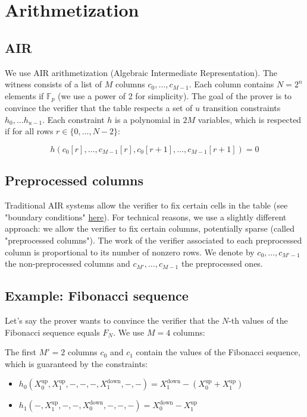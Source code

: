 \documentclass{article}
\newcommand{\Fp}{\mathbb F_p}
\begin{document}
\section{Arithmetization}

\subsection{AIR}

We use AIR arithmetization (Algebraic Intermediate Representation). The witness consists of a list of $M$ columns $c_0, \dots, c_{M-1}$. Each column contains $N = 2^n$ elements if $\Fp$ (we use a power of 2 for simplicity). The goal of the prover is to convince the verifier that the table respects a set of $u$ transition constraints $h_0, \dots h_{u-1}$. Each constraint $h$ is a polynomial in $2 M$ variables, which is respected if for all rows $r \in \{0, \dots, N-2\}$: 

$$h(c_0[r], \dots, c_{M-1}[r], c_0[r+1], \dots, c_{M-1}[r+1]) = 0$$

\subsection{Preprocessed columns}

Traditional AIR systems allow the verifier to fix certain cells in the table (see "boundary conditions" \href{https://aszepieniec.github.io/stark-anatomy/stark}{here}). For technical reasons, we use a slightly different approach: we allow the verifier to fix certain columns, potentially sparse (called "preprocessed columns"). The work of the verifier associated to each preprocessed column is proportional to its number of nonzero rows. We denote by $c_0, \dots, c_{M'-1}$ the non-preprocessed columns and $c_{M'}, \dots, c_{M-1}$ the preprocessed ones.

\subsection{Example: Fibonacci sequence}

Let's say the prover wants to convince the verifier that the $N$-th values of the Fibonacci sequence equals $F_N$. We use $M = 4$ columns:

The first $M' = 2$ columns $c_0$ and $c_1$ contain the values of the Fibonacci sequence, which is guaranteed by the constraints:

\begin{itemize}
    \item $h_0(X_0^{\text{up}}, X_1^{\text{up}}, -, -, -, X_1^{\text{down}}, -, -) = X_1^{\text{down}} - (X_0^{\text{up}} + X_1^{\text{up}})$
 \item $h_1(-, X_1^{\text{up}}, -, -, X_0^{\text{down}}, -, -, -) = X_0^{\text{down}} - X_1^{\text{up}}$
\end{itemize}
\end{document}
